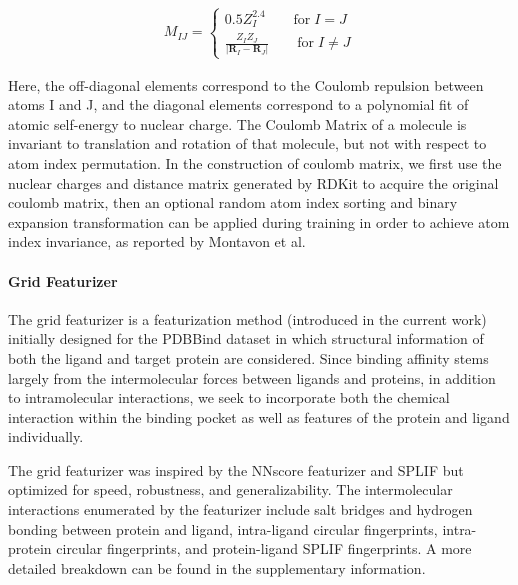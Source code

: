 \begin{eqnarray*}
    M_{IJ}=
    \begin{cases}
    0.5Z_I^{2.4}\qquad\mbox{for}\;I=J \\
    \frac{Z_IZ_J}{|\bm{R}_I-\bm{R}_J|}\qquad\mbox{for}\;I\neq J
    \end{cases}
\end{eqnarray*}

Here, the off-diagonal elements correspond to the Coulomb repulsion between atoms I and J, and the diagonal elements correspond to a polynomial fit of atomic self-energy to nuclear charge.  The Coulomb Matrix of a molecule is invariant to translation and rotation of that molecule, but not with respect to atom index permutation.  In the construction of coulomb matrix, we first use the nuclear charges and distance matrix generated by RDKit\cite{RDKit} to acquire the original coulomb matrix, then an optional random atom index sorting and binary expansion transformation can be applied during training in order to achieve atom index invariance, as reported by Montavon et al.\cite{GDB7_dataset_arxiv}

\paragraph{Grid Featurizer}

The grid featurizer is a featurization method (introduced in the current work) initially designed for the PDBBind dataset in which structural information of both the ligand and target protein are considered. Since binding affinity stems largely from the intermolecular forces between ligands and proteins, in addition to intramolecular interactions, we seek to incorporate both the chemical interaction within the binding pocket as well as features of the protein and ligand individually.

The grid featurizer was inspired by the NNscore featurizer \cite{NNscore} and SPLIF \cite{da2014structural} but optimized for speed, robustness, and generalizability. The intermolecular interactions enumerated by the featurizer include salt bridges and hydrogen bonding between protein and ligand, intra-ligand circular fingerprints, intra-protein circular fingerprints, and protein-ligand SPLIF fingerprints. A more detailed breakdown can be found in the supplementary information\dag.



